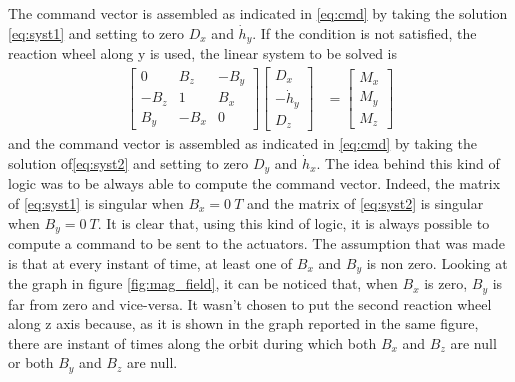  The command vector is assembled as indicated in \autoref{eq:cmd} by taking the solution \autoref{eq:syst1} and setting to zero $D_x$ and $\Dot{h}_y$.  If the condition is not satisfied, the reaction wheel along y is used, the linear system to be solved is 
\begin{equation}
 \label{eq:syst2}
 \begin{aligned} 
    \begin{bmatrix}
        0 & B_z & -B_y \\
        -B_z & 1 & B_x \\
        B_y & -B_x & 0 
    \end{bmatrix}\begin{bmatrix}
        D_x \\
        -\Dot{h}_y \\
        D_z
    \end{bmatrix} &=\begin{bmatrix}
        M_x \\
        M_y \\
        M_z
    \end{bmatrix}
  \end{aligned}
\end{equation}
  and the command vector is assembled as indicated in \autoref{eq:cmd} by taking the solution of\autoref{eq:syst2} and setting to zero $D_y$ and $\Dot{h}_x$. The idea behind this kind of logic was to be always able to compute the command vector. Indeed, the matrix of \autoref{eq:syst1} is singular when $B_x=0 \ T$ and the matrix of \autoref{eq:syst2} is singular when $B_y= 0 \ T$. It is clear that, using this kind of logic, it is always possible to compute a command to be sent to the actuators. The assumption that was made is that at every instant of time, at least one of $B_x$ and $B_y$ is non zero. Looking at the graph in figure \autoref{fig:mag_field}, it can be noticed that, when $B_x$ is zero, $B_y$ is far from zero and vice-versa. It wasn't chosen to put the second reaction wheel along z axis because, as it is shown in the graph reported in the same figure, there are instant of times along the orbit during which both $B_x$ and $B_z$ are null or both $B_y$ and $B_z$ are null.

